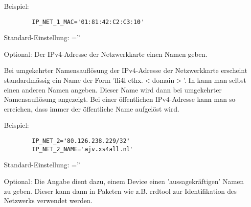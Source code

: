 \begin{description}
{    Beispiel:

    \begin{example}
    \begin{verbatim}
        IP_NET_1_MAC='01:81:42:C2:C3:10'
    \end{verbatim}
    \end{example}
    }


  Standard-Einstellung: =''
  
  {Optional: Der IPv4-Adresse der Netzwerkkarte einen Namen geben.
    
    Bei umgekehrter Namensauflösung der IPv4-Adresse der Netzwerkkarte erscheint
    standardmässig ein Name der Form 'fli4l-ethx.$<$domain$>$'. In
     kann man selbst einen anderen Namen angeben.
    Dieser Name wird dann bei umgekehrter Namensauflösung angezeigt.
    Bei einer öffentlichen IPv4-Adresse kann man so erreichen, dass immer
    der öffentliche Name aufgelöst wird.

    Beispiel:

    \begin{example}
    \begin{verbatim}
        IP_NET_2='80.126.238.229/32'
        IP_NET_2_NAME='ajv.xs4all.nl'
    \end{verbatim}
    \end{example}
    }


    
    Standard-Einstellung: =''
    
    {Optional:  Die Angabe dient dazu, einem Device einen 'aussagekräftigen' Namen zu 
    geben. Dieser kann dann in Paketen wie z.B. rrdtool zur Identifikation des Netzwerks 
    verwendet werden.
    }

\end{description}
